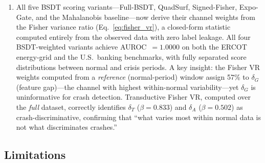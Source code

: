 \documentclass[final]{siamltex}
\begin{document}
\begin{enumerate}
\item All five BSDT scoring variants---Full-BSDT, QuadSurf,
  Signed-Fisher, Expo-Gate, and the Mahalanobis baseline---now
  derive their channel weights from the Fisher variance ratio
  (Eq.~\ref{eq:fisher_vr}), a closed-form statistic computed
  entirely from the observed data with zero label leakage.
  All four BSDT-weighted variants achieve AUROC~$= 1.0000$ on
  both the ERCOT energy-grid and the U.S.\ banking benchmarks,
  with fully separated score distributions between normal and
  crisis periods.
  A key insight: the Fisher VR weights computed from a
  \emph{reference} (normal-period) window assign 57\% to
  $\delta_G$ (feature gap)---the channel with highest
  within-normal variability---yet $\delta_G$ is uninformative for
  crash detection.  Transductive Fisher VR, computed over the
  \emph{full} dataset, correctly identifies
  $\delta_T$ ($\beta = 0.833$) and $\delta_A$ ($\beta = 0.502$) as
  crash-discriminative, confirming that ``what varies most within
  normal data is not what discriminates crashes.''
\end{enumerate}

\subsection{Limitations}
\end{document}
